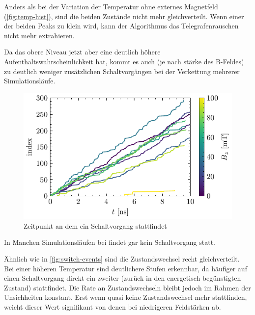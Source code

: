 \documentclass[main.tex]{subfiles}
\begin{document}
Anders als bei der Variation der Temperatur ohne externes Magnetfeld (\cref{fig:temp-hist}), sind die beiden Zustände nicht mehr gleichverteilt. Wenn einer der beiden Peaks zu klein wird, kann der Algorithmus das Telegrafenrauschen nicht mehr extrahieren. 

Da das obere Niveau jetzt aber eine deutlich höhere Aufenthaltswahrscheinlichkeit hat, kommt es auch (je nach stärke des B-Feldes) zu deutlich weniger zusätzlichen Schaltvorgängen bei der Verkettung mehrerer Simulationsläufe.


\begin{figure}[H]
    \centering
    \includegraphics{bilder/plots/max_Bz/switch_events.pdf}
    \caption{Zeitpunkt an dem ein Schaltvorgang stattfindet}\label{fig:bc-switch-events}   
\end{figure}


In Manchen Simulationsläufen bei  findet gar kein Schaltvorgang statt. 


Ähnlich wie in \cref{fig:switch-events} sind die Zustandswechsel recht gleichverteilt. Bei einer höheren Temperatur sind deutlichere Stufen erkennbar, da häufiger auf einen Schaltvorgang direkt ein zweiter (zurück in den energetisch begünstigten Zustand) stattfindet. Die Rate an Zustandswechseln bleibt jedoch im Rahmen der Unsichheiten konstant. Erst wenn quasi keine Zustandswechsel mehr stattfinden, weicht dieser Wert signifikant von denen bei niedrigeren Feldstärken ab. 
\end{document}
